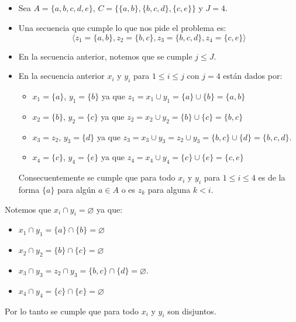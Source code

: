\documentclass[spanish, xcolor=dvipsnames, aspectratio=169]{beamer}
\newcommand{\subsectiontitle}{}
\begin{document}
\subsection{\subsectiontitle}
\begin{frame}{\subsectiontitle}
\begin{itemize}
    \item Sea \(A = \{a, b, c, d, e\}\), \(C = \{\{a, b\}, \{b, c, d\}, \{c, e\}\}\) y \(J = 4\).
    \item Una secuencia que cumple lo que nos pide el problema es:
            \[
                \langle z_{1} = \{a, b\}, z_{2} = \{b, c\}, z_{3} = \{b, c, d\}, z_{4} = \{c, e \} \rangle
            \]
    \item En la secuencia anterior, notemos que se cumple \(j \leq J\).
    \item En la secuencia anterior \(x_{i}\) y \(y_{i}\) para \(1 \leq i \leq j\) con \(j = 4\) están dados por:
    \begin{itemize}
        \item \(x_{1} = \{a\}\), \(y_{1} = \{b\}\) ya que \(z_{1} = x_{1} \cup y_{1} = \{a\} \cup \{b\} = \{a, b\}\)
        \item \(x_{2} = \{b\}\), \(y_{2} = \{c\}\) ya que \(z_{2} = x_{2} \cup y_{2} = \{b\} \cup \{c\} = \{b, c\}\)
        \item \(x_{3} = z_{2}\), \(y_{3} = \{d\}\) ya que \(z_{3} = x_{3} \cup y_{3} = z_{2} \cup y_{3} = \{b, c\} \cup \{d\} = \{b, c, d\}\).
        \item \(x_{4} = \{c\}\), \(y_{4} = \{e\}\) ya que \(z_{4} = x_{4} \cup y_{4} = \{c\} \cup \{e\} = \{c, e\}\)
    \end{itemize}
    Consecuentemente se cumple que para todo \(x_{i}\) y \(y_{i}\) para \(1 \leq i \leq 4\) es de la forma $\{ a \}$ para algún $a \in A$ o 
    es $z_{k}$ para alguna $k < i$.
    \end{itemize}
\end{frame}
\begin{frame}{\subsectiontitle}
    Notemos que \(x_{i} \cap y_{i} = \varnothing\) ya que:
    \begin{itemize}
        \item \(x_{1} \cap y_{1} = \{a\} \cap \{b\} = \varnothing\)
        \item \(x_{2} \cap y_{2} = \{b\} \cap \{c\} = \varnothing\)
        \item \(x_{3} \cap y_{3} = z_{2} \cap y_{3} = \{b, c\} \cap \{d\} = \varnothing\).
        \item \(x_{4} \cap y_{4} = \{c\} \cap \{e\} = \varnothing\)
    \end{itemize}
    Por lo tanto se cumple que para todo \(x_{i}\) y \(y_{i}\) son disjuntos.
\end{frame}
\end{document}
